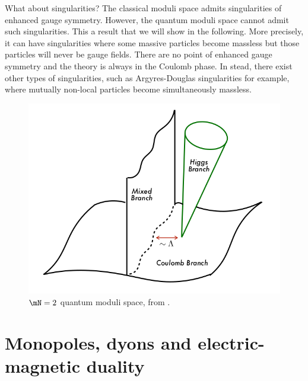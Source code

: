 \documentclass{worksheetclass}
\begin{document}
        What about singularities? The classical moduli space admits singularities of enhanced gauge symmetry. However, the quantum moduli space cannot admit such singularities. This a result that we will show in the following. More precisely, it can have singularities where some massive particles become massless but those particles will never be gauge fields. There are no point of enhanced gauge symmetry and the theory is always in the Coulomb phase. In stead, there exist other types of singularities, such as Argyres-Douglas singularities for example, where mutually non-local particles become simultaneously massless.

        \begin{figure}[H]
            \centering
            \includegraphics[scale=0.35]{Pictures/quantummodulispace.png}
            \caption{$\mN=2$ quantum moduli space, from \cite{bertolinisusy}.}
        \end{figure}

\section{Monopoles, dyons and electric-magnetic duality}
\end{document}

